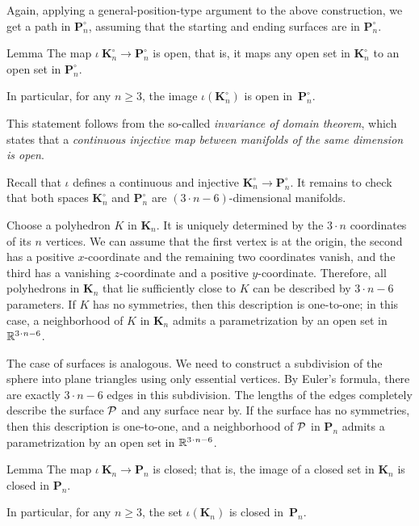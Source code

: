 Again, applying a general-position-type argument to the above construction, we get a path in $\bm{P}_n^\circ$, assuming that the starting and ending surfaces are in $\bm{P}_n^\circ$.

\begin{thm}{Lemma}\label{lem:open}
The map $\iota\:\bm{K}_n^\circ\to\bm{P}_n^\circ$ is open,
that is, it maps any open set in $\bm{K}_n^\circ$ to an open set in $\bm{P}_n^\circ$.

In particular, for any $n\ge 3$, the image $\iota(\bm{K}_n^\circ)$ is open in~$\bm{P}_n^\circ$.
\end{thm}

This statement follows from the so-called \emph{invariance of domain theorem},
which states that a \textit{continuous injective map between manifolds of the same dimension is open}.

Recall that $\iota$ defines a continuous and injective $\bm{K}_n^\circ\to\bm{P}_n^\circ$.
It remains to check that both spaces $\bm{K}_n^\circ$ and $\bm{P}_n^\circ$ are $(3\cdot n-6)$-dimensional manifolds.

Choose a polyhedron $K$ in $\bm{K}_n$.
It is uniquely determined by the $3\cdot n$ coordinates of its $n$ vertices.
We can assume that the first vertex is at the origin,
the second has a positive $x$-coordinate
and the remaining two coordinates vanish,
and the third has a vanishing $z$-coordinate and a positive $y$-coordinate.
Therefore, all polyhedrons in $\bm{K}_n$ that lie sufficiently close to $K$ can be described by $3\cdot n-6$ parameters.
If $K$ has no symmetries, then this description is one-to-one;
in this case, a neighborhood of $K$ in $\bm{K}_n$ admits a parametrization by an open set in $\RR^{3\cdot n-6}$.

The case of surfaces is analogous.
We need to construct a subdivision of the sphere into plane triangles using only essential vertices.
By Euler's formula, there are exactly $3\cdot n-6$ edges in this subdivision.
The lengths of the edges completely describe the surface $\mathcal{P}$ and any surface near by.
If the surface has no symmetries, then this description is one-to-one, and a neighborhood of $\mathcal{P}$ in $\bm{P}_n$ admits a parametrization by an open set in  $\RR^{3\cdot n-6}$.

\begin{thm}{Lemma}\label{lem:closed}
The map $\iota\:\bm{K}_n\to\bm{P}_n$ is closed;
that is, the image of a closed set in $\bm{K}_n$ is closed in $\bm{P}_n$.

In particular, for any $n\ge 3$, the set $\iota(\bm{K}_n)$ is closed in~$\bm{P}_n$.
\end{thm}


